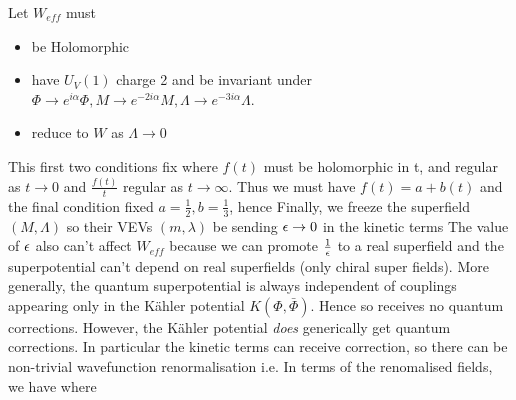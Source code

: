 \documentclass{article}
\begin{document}

Let 
$W_{eff}$ must  
\begin{itemize}
    \item be Holomorphic 
    \item have $U_V(1)$ charge 2 and be invariant under $\Phi \to e^{i\alpha}\Phi, M \to e^{-2i\alpha}M, \Lambda \to e^{-3i\alpha}\Lambda$.
    \item reduce to $W$ as $\Lambda \to 0$
\end{itemize}
This first two conditions fix 
where $f(t)$ must be holomorphic in t, and regular as $t \to 0$ and $\frac{f(t)}{t}$ regular as $t \to \infty$. Thus we must have $f(t) = a+b(t)$ and the final condition fixed $a=\frac{1}{2}, b = \frac{1}{3}$, hence 
Finally, we freeze the superfield $(M,\Lambda)$ so their VEVs $(m,\lambda)$ be sending $\epsilon \to 0$ in the kinetic terms 
The value of $\epsilon$ also can't affect $W_{eff}$ because we can promote $\frac{1}{\epsilon}$ to a real superfield and the superpotential can't depend on real superfields (only chiral super fields). More generally, the quantum superpotential is always independent of couplings appearing only in the K\"ahler potential $K(\Phi,\bar{\Phi})$. Hence 
so receives no quantum corrections. However, the K\"ahler potential \emph{does} generically get quantum corrections. In particular the kinetic terms can receive correction, so there can be non-trivial wavefunction renormalisation 
i.e. 
In terms of the renomalised fields, we have
where 


\end{document}
